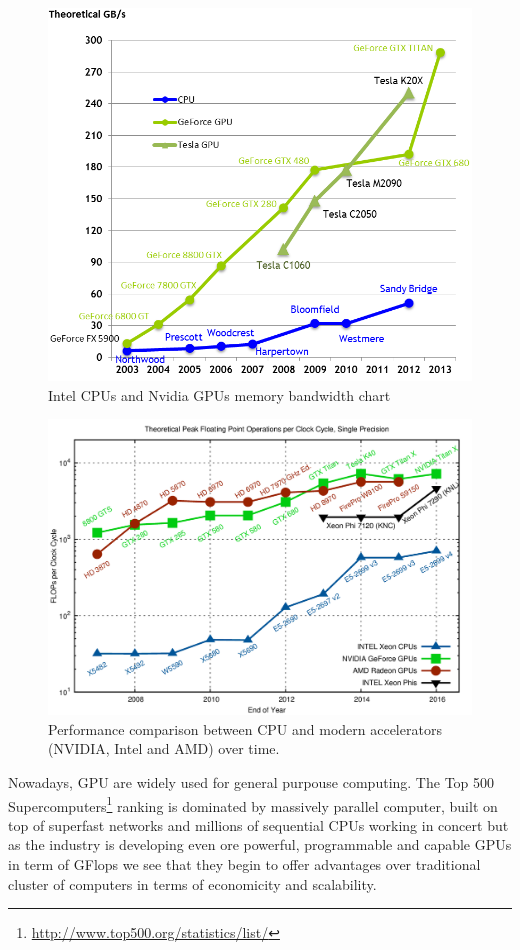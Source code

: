     \begin{figure}
    	\centering
    	\includegraphics[width=1.0\textwidth]{./images/parallel_programming/memory-bandwidth}
    	\caption{Intel CPUs and Nvidia GPUs memory bandwidth
    		chart}\label{CPU-VS-GPU_MEMORY}
    \end{figure}
    \begin{figure}
    	\centering
    	\includegraphics[width=1.0\textwidth]{./images/parallel_programming/cpu-vs-gpu}
    	\caption{Performance comparison between CPU and modern accelerators (NVIDIA, Intel and AMD) over time.}\label{CPU-VS-GPU_GFLOP}
    \end{figure}
    Nowadays, GPU are widely used for general purpouse computing. The Top 500 Supercomputers\footnote{\url{http://www.top500.org/statistics/list/}} ranking is dominated by massively parallel computer, built on top of superfast networks and millions of sequential CPUs working in concert but as the industry is developing even ore powerful, programmable and capable GPUs in term of GFlops  we see that they begin to offer advantages over traditional cluster of computers in terms of economicity and scalability.
    
